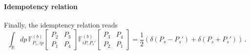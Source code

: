 \documentclass[11pt]{article}
\begin{document}
\paragraph{Idempotency relation}
Finally, the idemptency relation reads
\begin{equation}\label{eq:idempotencyf}
    \int_{\mathbb{R}} dp \,\mathbb{F}^{(b)}_{P_s, ip} \begin{bmatrix}
     P_2 & P_3 \\
     P_1 & P_4
    \end{bmatrix}
    \mathbb{F}^{(b)}_{iP, P_s'} \begin{bmatrix}
     P_3 & P_4 \\
     P_2 & P_1
    \end{bmatrix}
    = \frac{1}{2} \left(\delta(P_s - P_s')+\delta(P_s+P_s')\right)\,.
\end{equation}
\end{document}
